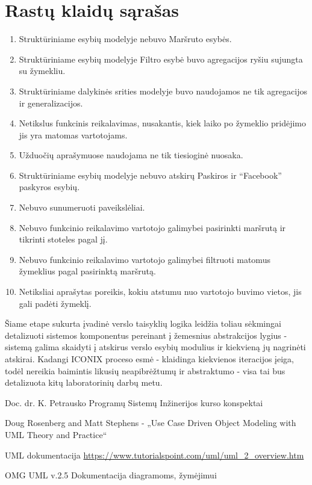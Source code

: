 \documentclass{VUMIFPSkursinis}
\begin{document}
\section{Rastų klaidų sąrašas}
	\begin{enumerate}
		\item Struktūriniame esybių modelyje nebuvo Maršruto esybės.
		\item Struktūriniame esybių modelyje Filtro esybė buvo agregacijos ryšiu sujungta su žymekliu.
		\item Struktūriniame dalykinės srities modelyje buvo naudojamos ne tik agregacijos ir generalizacijos.
		\item Netikslus funkcinis reikalavimas, nusakantis, kiek laiko po žymeklio pridėjimo jis yra matomas vartotojams.
		\item Užduočių aprašymuose naudojama ne tik tiesioginė nuosaka.
		\item Struktūriniame esybių modelyje nebuvo atskirų Paskiros ir “Facebook” paskyros esybių.
		\item Nebuvo sunumeruoti paveikslėliai.
		\item Nebuvo funkcinio reikalavimo vartotojo galimybei pasirinkti maršrutą ir tikrinti stoteles pagal jį.
		\item Nebuvo funkcinio reikalavimo vartotojo galimybei filtruoti matomus žymeklius pagal pasirinktą maršrutą.
		\item Netiksliai aprašytas poreikis, kokiu atstumu nuo vartotojo buvimo vietos, jis gali padėti žymeklį.
	\end{enumerate}
Šiame etape sukurta įvadinė verslo taisyklių logika leidžia toliau sėkmingai detalizuoti sistemos komponentus pereinant į žemesnius abstrakcijos lygius - sistemą galima skaidyti į atskirus verslo esybių modulius ir kiekvieną jų nagrinėti atskirai. Kadangi ICONIX proceso esmė - klaidinga kiekvienos iteracijos įeiga, todėl nereikia baimintis likusių neapibrėžtumų ir abstraktumo - visa tai bus detalizuota kitų laboratorinių darbų metu.

\begin{enumerate}[label={[\arabic*]}]
	\item Doc. dr. K. Petrausko Programų Sistemų Inžinerijos kurso konspektai
	\item Doug Rosenberg and Matt Stephens - „Use Case Driven Object Modeling with UML Theory and Practice“
	\item UML dokumentacija \url{https://www.tutorialspoint.com/uml/uml_2_overview.htm}
	\item OMG UML v.2.5 Dokumentacija diagramoms, žymėjimui
\end{enumerate}
\end{document}
